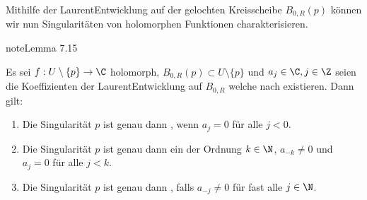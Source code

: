 \documentclass[letterpaper,10pt,german]{jupyterBook}
\begin{document}
\sphinxAtStartPar
Mithilfe der Laurent\sphinxhyphen{}Entwicklung auf der gelochten Kreisscheibe \(B_{0,R}(p)\) können wir nun Singularitäten von holomorphen Funktionen charakterisieren.
\label{complexanalysis/residuensatz:lemma-6}
\begin{sphinxadmonition}{note}{Lemma 7.15}



\sphinxAtStartPar
Es sei \(f:U\setminus\{p\}\to\C\) holomorph, \(B_{0,R}(p)\subset U\setminus\{p\}\) und \(a_j\in\C, j\in\Z\) seien die Koeffizienten der Laurent\sphinxhyphen{}Entwicklung auf \(B_{0,R}\) welche nach {\hyperref[\detokenize{complexanalysis/residuensatz:lem:laurent}]{}} existieren. Dann gilt:
\begin{enumerate}
%
\item {} 
\sphinxAtStartPar
Die Singularität \(p\) ist genau dann , wenn \(a_{j}=0\) für alle \(j<0\).

\item {} 
\sphinxAtStartPar
Die Singularität \(p\) ist genau dann ein  der Ordnung \(k\in\N\), \(a_{-k}\neq 0\) und \(a_j = 0\) für alle \(j<k\).

\item {} 
\sphinxAtStartPar
Die Singularität \(p\) ist genau dann , falls \(a_{-j}\neq 0\) für fast alle \(j\in\N\).

\end{enumerate}
\end{sphinxadmonition}
\end{document}
